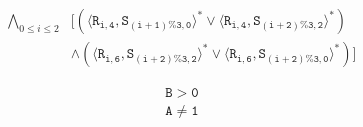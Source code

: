 \newsavebox{\boxMPZero}
\begin{lrbox}{\boxMPZero}
\begin{minipage}[t]{0.55\linewidth}
\large
\begin{align*}
\bigwedge_{0 \leq i \leq 2} & [(\langle\mathtt{R_{i,4}},\mathtt{S_{(i+1)\%3,0}}\rangle^* \vee\langle\mathtt{R_{i,4}},\mathtt{S_{(i+2) \% 3,2}}\rangle^*)\\
                                          & \wedge(\langle\mathtt{R_{i,6}},\mathtt{S_{(i+2)\%3,2}}\rangle^* \vee \langle\mathtt{R_{i,6}},\mathtt{S_{(i+2)\%3,0}}\rangle^*)]
\end{align*}
\end{minipage}
\end{lrbox}

\newsavebox{\boxProperty}
\begin{lrbox}{\boxProperty}
\begin{minipage}[t]{0.55\linewidth}
\large
\begin{align*}
\mathtt{B > 0}\\
\mathtt{A \neq 1}\\
\end{align*}
\end{minipage}
\end{lrbox}

\newcommand\exampleencoding{
\begin{figure*}[t]
\begin{center}
\setlength{\tabcolsep}{6pt}
\renewcommand{\arraystretch}{1.5}
\begin{tabular}[t]{p{1.5cm}ll}
Program Order & \scalebox{0.7}{\usebox{\boxPOInfinite}} & \scalebox{0.7}{\usebox{\boxPOZero}}\\
Match Pairs & \scalebox{0.7}{\usebox{\boxMPInfinite}} &  \scalebox{0.7}{\usebox{\boxMPZero}}\\
Program Properties   & \scalebox{0.7}{\usebox{\boxProperty}} & \scalebox{0.7}{\usebox{\boxProperty}}\\
&\multicolumn{1}{c}{(a)} &\multicolumn{1}{c}{(b)}\\
\end{tabular}
\end{center}
\caption{SMT encoding for an MPI concurrent trace program in \figref{fig:mpi}. (a) Infinite Buffer Encoding. (b) Zero Buffer Encoding.}
\label{fig:mpiencoding}
\end{figure*}
}


